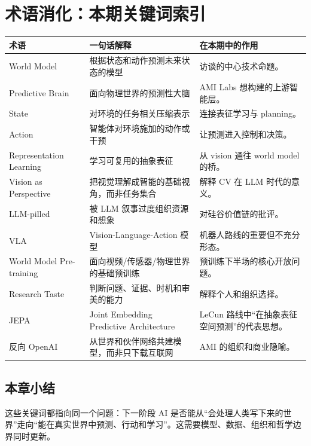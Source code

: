 \section{术语消化：本期关键词索引}

\begin{longtable}{p{}p{}p{}}
\toprule
术语 & 一句话解释 & 在本期中的作用 \\
\midrule
World Model & 根据状态和动作预测未来状态的模型 & 访谈的中心技术命题。 \\
Predictive Brain & 面向物理世界的预测性大脑 & AMI Labs 想构建的上游智能层。 \\
State & 对环境的任务相关压缩表示 & 连接表征学习与 planning。 \\
Action & 智能体对环境施加的动作或干预 & 让预测进入控制和决策。 \\
Representation Learning & 学习可复用的抽象表征 & 从 vision 通往 world model 的桥。 \\
Vision as Perspective & 把视觉理解成智能的基础视角，而非任务集合 & 解释 CV 在 LLM 时代的意义。 \\
LLM-pilled & 被 LLM 叙事过度组织资源和想象 & 对硅谷价值链的批评。 \\
VLA & Vision-Language-Action 模型 & 机器人路线的重要但不充分形态。 \\
World Model Pre-training & 面向视频/传感器/物理世界的基础预训练 & 预训练下半场的核心开放问题。 \\
Research Taste & 判断问题、证据、时机和审美的能力 & 解释个人和组织选择。 \\
JEPA & Joint Embedding Predictive Architecture & LeCun 路线中“在抽象表征空间预测”的代表思想。 \\
反向 OpenAI & 从世界和伙伴网络共建模型，而非只下载互联网 & AMI 的组织和商业隐喻。 \\
\bottomrule
\end{longtable}

\subsection{本章小结}

这些关键词都指向同一个问题：下一阶段 AI 是否能从“会处理人类写下来的世界”走向“能在真实世界中预测、行动和学习”。这需要模型、数据、组织和哲学边界同时更新。

